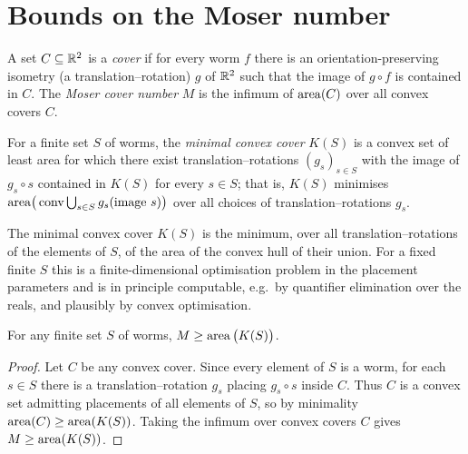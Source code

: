 \section{Bounds on the Moser number}

\begin{definition}
    \label{def:moserNumber}
    A set $C \subseteq \mathbb{R}^2$ is a \emph{cover} if for every worm $f$ there is
    an orientation-preserving isometry (a translation--rotation) $g$ of $\mathbb{R}^2$
    such that the image of $g \circ f$ is contained in $C$. The \emph{Moser
    cover number} $M$ is the infimum of $\operatorname{area}(C)$ over all convex covers $C$.
\end{definition}

\begin{definition}
    \label{def:minimalCover}
    For a finite set $S$ of worms, the \emph{minimal convex cover} $K(S)$ is a
    convex set of least area for which there exist translation--rotations
    $(g_s)_{s \in S}$ with the image of $g_s \circ s$ contained in $K(S)$ for
    every $s \in S$; that is, $K(S)$ minimises
    $\operatorname{area}\!\big(\operatorname{conv} \bigcup_{s \in S} g_s(\operatorname{image}\, s)\big)$ over all choices
    of translation--rotations $g_s$.
\end{definition}

\begin{remark}
    \label{rem:computeMinimalCover}
    The minimal convex cover $K(S)$ is the minimum, over all
    translation--rotations of the elements of $S$, of the area of the convex
    hull of their union. For a fixed finite $S$ this is a finite-dimensional
    optimisation problem in the placement parameters and is in principle
    computable, e.g.\ by quantifier elimination over the reals, and plausibly
    by convex optimisation.
\end{remark}

\begin{theorem}
    \label{thm:lowerBound}
    For any finite set $S$ of worms, $M \ge \operatorname{area}\big(K(S)\big)$.
\end{theorem}
\begin{proof}
    Let $C$ be any convex cover. Since every element of $S$ is a worm, for each
    $s \in S$ there is a translation--rotation $g_s$ placing $g_s \circ s$
    inside $C$. Thus $C$ is a convex set admitting placements of all elements of
    $S$, so by minimality $\operatorname{area}(C) \ge \operatorname{area}(K(S))$. Taking the infimum over
    convex covers $C$ gives $M \ge \operatorname{area}(K(S))$.
\end{proof}


